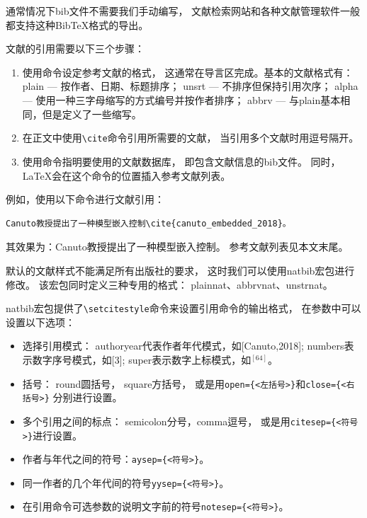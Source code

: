 \documentclass[UTF8]{ctexart}
\numberwithin{equation}{section}			%
\begin{document}
    通常情况下bib文件不需要我们手动编写，
    文献检索网站和各种文献管理软件一般都支持这种BibTeX格式的导出。
    
    文献的引用需要以下三个步骤：
    
    \begin{enumerate}
        \item 使用\verb||命令设定参考文献的格式，
        这通常在导言区完成。基本的文献格式有：
        plain --- 按作者、日期、标题排序；
        unsrt --- 不排序但保持引用次序；
        alpha --- 使用一种三字母缩写的方式编号并按作者排序；
        abbrv --- 与plain基本相同，但是定义了一些缩写。
        
        \item 在正文中使用\verb|\cite|命令引用所需要的文献，
        当引用多个文献时用逗号隔开。
        
        \item 使用\verb||命令指明要使用的文献数据库，
        即包含文献信息的bib文件。
        同时， \LaTeX 会在这个命令的位置插入参考文献列表。
    \end{enumerate}

    例如，使用以下命令进行文献引用：

\begin{lstlisting}
Canuto教授提出了一种模型嵌入控制\cite{canuto_embedded_2018}。
\end{lstlisting}
    
    其效果为：Canuto教授提出了一种模型嵌入控制\cite{canuto_embedded_2018}。
    参考文献列表见本文末尾。
    
    默认的文献样式不能满足所有出版社的要求，
    这时我们可以使用natbib宏包进行修改。
    该宏包同时定义三种专用的格式：
    plainnat、abbrvnat、unstrnat。
    
    natbib宏包提供了\verb|\setcitestyle|命令来设置引用命令的输出格式，
    在参数中可以设置以下选项：
    
    \begin{itemize}
        \item 选择引用模式：
        authoryear代表作者年代模式，如[Canuto,2018];
        numbers表示数字序号模式，如[3];
        super表示数字上标模式，如${}^{[64]}$。
        
        \item 括号：
        round圆括号，
        square方括号，
        或是用\verb|open={<左括号>}|和\verb|close={<右括号>}|
        分别进行设置。
        
        \item 多个引用之间的标点：
        semicolon分号，comma逗号，
        或是用\verb|citesep={<符号>}|进行设置。
        
        \item 作者与年代之间的符号：\verb|aysep={<符号>}|。
        
        \item 同一作者的几个年代间的符号\verb|yysep={<符号>}|。
        
        \item 在引用命令可选参数的说明文字前的符号\verb|notesep={<符号>}|。
    \end{itemize}
\end{document}
